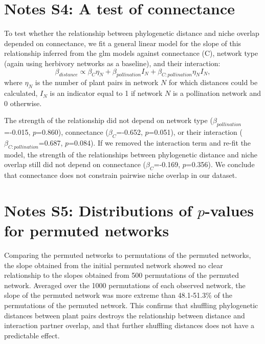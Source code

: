 \documentclass[12pt]{article}
\begin{document}
\begin{spacing}{1.5}
\section*{Notes S4: A test of connectance}

    To test whether the relationship between phylogenetic distance and niche overlap depended on connectance, we fit a general linear model for the slope of this relationship inferred from the glm models against connectance (C), network type (again using herbivory networks as a baseline), and their interaction:
      \begin{equation}
        \beta_{distance} \propto \beta_{C} \eta_{N} + \beta_{pollination} I_N + \beta_{C:pollination} \eta_{N} I_N ,
      \end{equation}
    where $\eta_{N}$ is the number of plant pairs in network $N$ for which distances could be calculated, $I_N$ is an indicator equal to 1 if network $N$ is a pollination network and 0 otherwise. 

    
    The strength of the relationship did not depend on network type ($\beta_{pollination}$=-0.015, $p$=0.860), connectance ($\beta_{C}$=-0.652, $p$=0.051), or their interaction ($\beta_{C:pollination}$=0.687, $p$=0.084). 
    If we removed the interaction term and re-fit the model, the strength of the relationships between phylogenetic distance and niche overlap still did not depend on connectance ($\beta_{C}$=-0.169, $p$=0.356). We conclude that connectance does not constrain pairwise niche overlap in our dataset.


\clearpage

\section*{Notes S5: Distributions of $p$-values for permuted networks}


    Comparing the permuted networks to permutations of the permuted networks, the slope obtained from the initial permuted network showed no clear relationship to the slopes obtained from 500 permutations of the permuted network. Averaged over the 1000 permutations of each observed network, the slope of the permuted network was more extreme than 48.1-51.3\% of the permutations of the permuted network. This confirms that shuffling phylogenetic distances between plant pairs destroys the relationship between distance and interaction partner overlap, and that further shuffling distances does not have a predictable effect.



\end{spacing}
\end{document}
